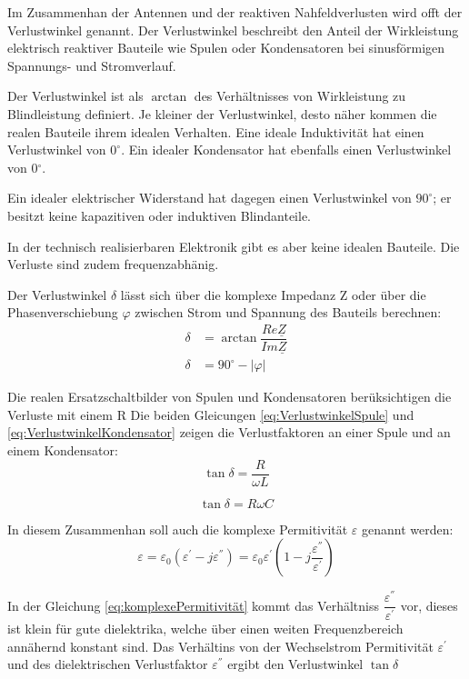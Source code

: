 Im Zusammenhan der Antennen und der reaktiven Nahfeldverlusten wird offt der Verlustwinkel genannt.  Der Verlustwinkel beschreibt den Anteil der Wirkleistung elektrisch reaktiver Bauteile wie Spulen oder Kondensatoren bei sinusförmigen Spannungs- und Stromverlauf. 

Der Verlustwinkel ist als $\arctan$ des Verhältnisses von Wirkleistung zu Blindleistung definiert. 
Je kleiner der Verlustwinkel, desto näher kommen die realen Bauteile ihrem idealen Verhalten. Eine ideale Induktivität hat einen Verlustwinkel von $0^\circ$. Ein idealer Kondensator hat ebenfalls einen Verlustwinkel von 0$^\circ$.

Ein idealer elektrischer Widerstand hat dagegen einen Verlustwinkel von $90^\circ$; er besitzt keine kapazitiven oder induktiven Blindanteile.

In der technisch realisierbaren Elektronik gibt es aber keine idealen Bauteile. Die Verluste sind zudem frequenzabhänig.

Der Verlustwinkel  $\delta$  lässt sich über die komplexe Impedanz Z oder über die Phasenverschiebung  $\varphi$  zwischen Strom und Spannung des Bauteils berechnen: 
\label{eq:Verlustwinkel}
\begin{align}
\delta &= \arctan \dfrac{Re\underline{Z}}{Im\underline{Z}} \\
\delta &= 90^\circ - |\varphi|
\end{align}

Die realen Ersatzschaltbilder von Spulen und Kondensatoren berüksichtigen die Verluste mit einem R
Die beiden Gleicungen \ref{eq:VerlustwinkelSpule} und \ref{eq:VerlustwinkelKondensator} zeigen die Verlustfaktoren an einer Spule und an einem Kondensator:
\begin{equation}\label{eq:VerlustwinkelSpule}
\tan \delta = \dfrac{R}{\omega L}
\end{equation}

\begin{equation} \label{eq:VerlustwinkelKondensator}
\tan \delta = R \omega C
\end{equation}

In diesem Zusammenhan soll auch die komplexe Permitivität $\varepsilon$ genannt werden:
\begin{equation} \label{eq:komplexePermitivität}
\varepsilon=\varepsilon_0(\varepsilon^{'}-j\varepsilon^{''})=\varepsilon_0\varepsilon^{'}(1-j\dfrac{\varepsilon^{''}}{\varepsilon^{'}})
\end{equation}

In der Gleichung \ref{eq:komplexePermitivität} kommt das Verhältniss $\dfrac{\varepsilon^{''}}{\varepsilon^{'}}$ vor, dieses ist klein für gute dielektrika, welche über einen weiten Frequenzbereich annähernd konstant sind. Das Verhältins von der Wechselstrom Permitivität $\varepsilon^{'}$ und des dielektrischen Verlustfaktor $\varepsilon^{''}$ ergibt den Verlustwinkel $\tan\delta$

